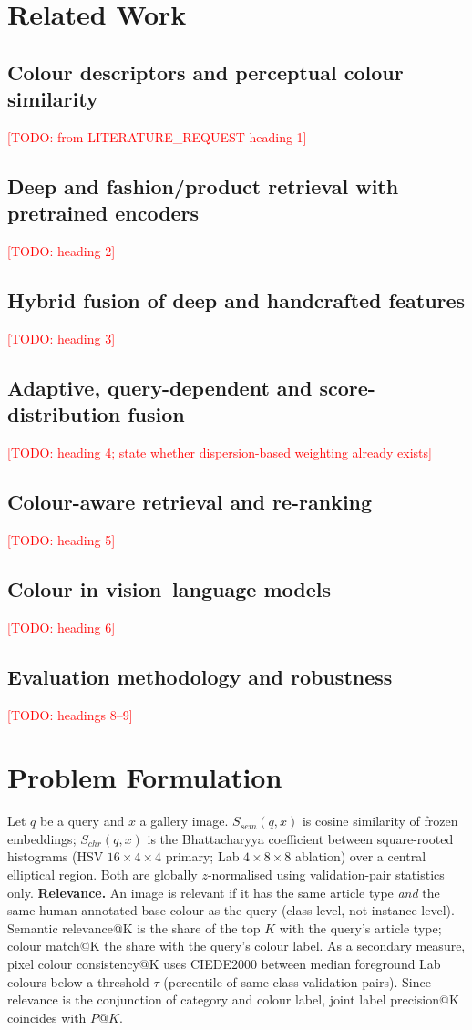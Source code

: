 \documentclass[11pt]{article}
\newcommand{\todo}[1]{\textcolor{red}{[TODO: #1]}}
\begin{document}
\section{Related Work}
\subsection{Colour descriptors and perceptual colour similarity}\todo{from LITERATURE\_REQUEST heading 1}
\subsection{Deep and fashion/product retrieval with pretrained encoders}\todo{heading 2}
\subsection{Hybrid fusion of deep and handcrafted features}\todo{heading 3}
\subsection{Adaptive, query-dependent and score-distribution fusion}\todo{heading 4; state whether dispersion-based weighting already exists}
\subsection{Colour-aware retrieval and re-ranking}\todo{heading 5}
\subsection{Colour in vision--language models}\todo{heading 6}
\subsection{Evaluation methodology and robustness}\todo{headings 8--9}

\section{Problem Formulation}
Let $q$ be a query and $x$ a gallery image. $S_{sem}(q,x)$ is cosine similarity of frozen embeddings; $S_{chr}(q,x)$ is the Bhattacharyya coefficient between square-rooted histograms (HSV $16{\times}4{\times}4$ primary; Lab $4{\times}8{\times}8$ ablation) over a central elliptical region. Both are globally $z$-normalised using validation-pair statistics only.
\textbf{Relevance.} An image is relevant if it has the same article type \emph{and} the same human-annotated base colour as the query (class-level, not instance-level). Semantic relevance@K is the share of the top $K$ with the query's article type; colour match@K the share with the query's colour label. As a secondary measure, pixel colour consistency@K uses CIEDE2000 between median foreground Lab colours below a threshold $\tau$ (percentile of same-class validation pairs). Since relevance is the conjunction of category and colour label, joint label precision@K coincides with $P@K$.
\end{document}

